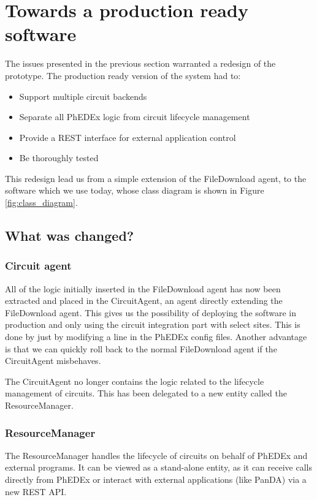 \section{Towards a production ready software}

The issues presented in the previous section warranted a redesign of the prototype.
The production ready version of the system had to:
\begin{itemize}
  \item Support multiple circuit backends
  \item Separate all PhEDEx logic from circuit lifecycle management
  \item Provide a REST interface for external application control
  \item Be thoroughly tested
\end{itemize}

This redesign lead us from a simple extension of the FileDownload agent, to the 
software which we use today, whose class diagram is shown in Figure \ref{fig:class_diagram}.

\subsection{What was changed?}

\subsubsection{Circuit agent}

All of the logic initially inserted in the FileDownload agent has now been extracted and 
placed in the CircuitAgent, an agent directly extending the FileDownload agent. This gives us 
the possibility of deploying the software in production and only using the circuit integration 
part with select sites. This is done by just by modifying a line in the PhEDEx config files.
Another advantage is that we can quickly roll back to the normal FileDownload agent if the 
CircuitAgent misbehaves.

The CircuitAgent no longer contains the logic related to the lifecycle management of circuits.
This has been delegated to a new entity called the ResourceManager.

\subsubsection{ResourceManager}

The ResourceManager handles the lifecycle of circuits on behalf of PhEDEx and external programs.
It can be viewed as a stand-alone entity, as it can receive calls directly from PhEDEx or 
interact with external applications (like PanDA) via a new REST API.

